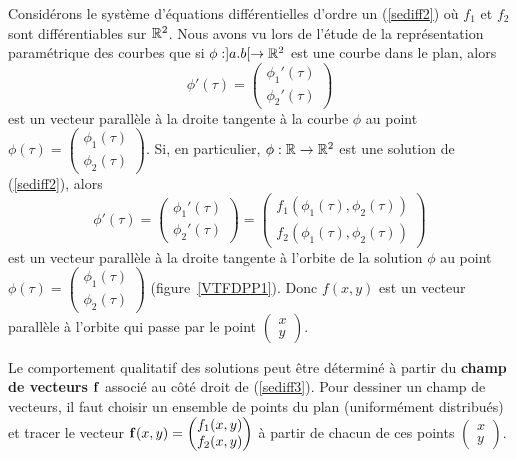 {Considérons le système d'équations différentielles d'ordre un
(\ref{sediff2}) où $f_1$ et $f_2$ sont différentiables sur $\mathbb{R}^2$.
Nous avons vu lors de l'étude de la représentation paramétrique des
courbes que si $\phi:]a.b[\rightarrow \mathbb{R}^2$ est une courbe dans le
plan, alors
\[
\phi'(\tau) = \begin{pmatrix} \phi_1'(\tau) \\ \phi_2'(\tau) \end{pmatrix}
\]
est un vecteur parallèle à la droite tangente à la courbe $\phi$ au point
$\displaystyle \phi(\tau) =
\begin{pmatrix} \phi_1(\tau) \\ \phi_2(\tau) \end{pmatrix}$.  Si, en
particulier, $\phi:\mathbb{R}\rightarrow \mathbb{R}^2$ est une solution de
(\ref{sediff2}), alors
\begin{equation} \label{vectgsed}
\phi'(\tau) =
\begin{pmatrix} \phi_1'(\tau) \\ \phi_2'(\tau) \end{pmatrix}
= \begin{pmatrix}
f_1(\phi_1(\tau), \phi_2(\tau)) \\
f_2(\phi_1(\tau), \phi_2(\tau))
\end{pmatrix}
\end{equation}
est un vecteur parallèle à la droite tangente à l'orbite de la solution
$\phi$ au point $\displaystyle \phi(\tau) =
\begin{pmatrix} \phi_1(\tau) \\ \phi_2(\tau) \end{pmatrix}$
(figure~\ref{VTFDPP1}).  Donc $f(x,y)$ est un vecteur parallèle à
l'orbite qui passe par le point
$\displaystyle \begin{pmatrix} x \\ y \end{pmatrix}$.


Le comportement qualitatif des solutions peut être déterminé à partir du
{\bfseries champ de vecteurs}
$\displaystyle \mathbf{f}$ associé au côté droit de (\ref{sediff3}).  Pour
dessiner un champ de vecteurs, il faut choisir un ensemble de points du
plan (uniformément distribués) et tracer le vecteur
$\displaystyle \mathbf{f}(x,y)
= \begin{pmatrix} f_1(x,y) \\ f_2(x,y) \end{pmatrix}$ à partir de
chacun de ces points $\displaystyle \begin{pmatrix} x \\ y \end{pmatrix}$.

}

